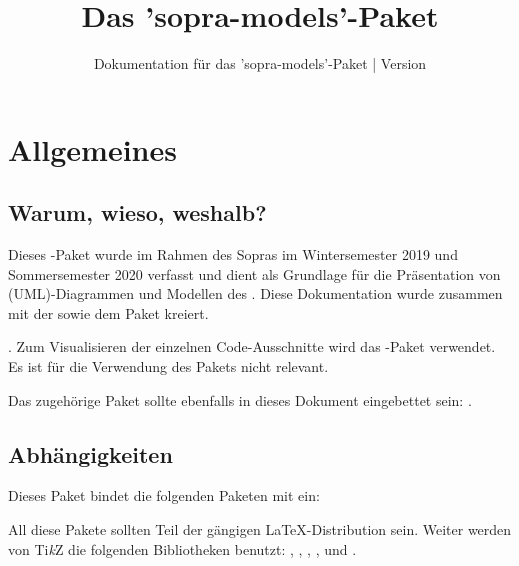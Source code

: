 \documentclass{sopra-base}
\title{Das 'sopra-models'-Paket}
\subtitle[Dokumentation für das 'sopra-models'-Paket]{Dokumentation für das 'sopra-models'-Paket | Version \thesomversion}
\begin{document}
    \maketitle

\section{Allgemeines}
\subsection{Warum, wieso, weshalb?}
    Dieses \LaTeXe-Paket wurde im Rahmen des Sopras im
    Wintersemester 2019 und Sommersemester 2020 verfasst und dient als
    Grundlage für die Präsentation von (UML)-Diagrammen und Modellen
    des . Diese Dokumentation wurde zusammen mit der
     sowie dem Paket  kreiert.\par
    .\newline
    Zum Visualisieren der einzelnen Code-Ausschnitte wird das
    -Paket verwendet. Es ist für die Verwendung des Pakets nicht relevant.\par
    Das zugehörige Paket sollte ebenfalls in dieses Dokument eingebettet sein: .
\subsection{Abhängigkeiten}
    Dieses Paket bindet die folgenden Paketen mit ein:
    \begin{multicols}{3}
    \end{multicols}
    All diese Pakete sollten Teil der gängigen \LaTeX-Distribution sein. Weiter werden von Ti\textit{k}Z die folgenden
    Bibliotheken benutzt: , , , ,  und .
\end{document}
